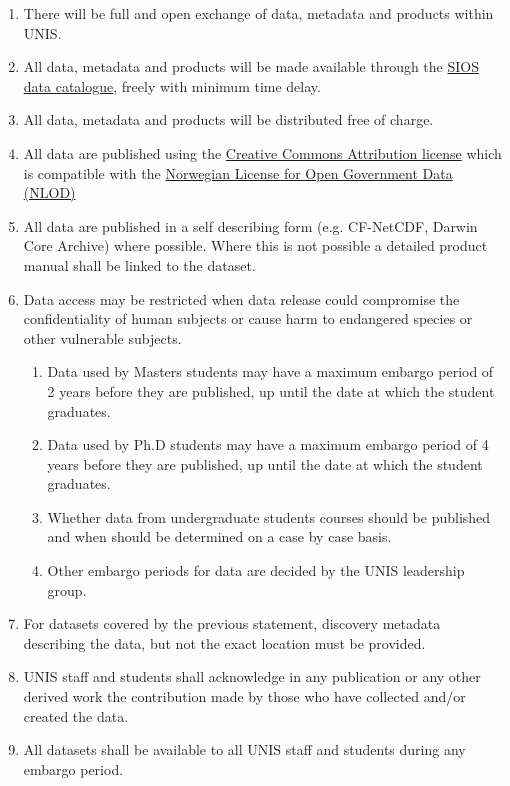 \documentclass[a4paper,english, 11pt]{article}
\begin{document}
\begin{enumerate}[I]
\item There will be full and open exchange of data, metadata and products within UNIS.
\item All data, metadata and products will be made available through the \href{https://sios-svalbard.org/metsis/search}{SIOS data catalogue}, freely with minimum time delay.
\item All data, metadata and products will be distributed free of charge.
\item All data are published using the \href{https://creativecommons.org/licenses/by/4.0/}{Creative Commons Attribution license} which is
compatible with the \href{https://data.norge.no/nlod/en}{Norwegian License for Open Government Data (NLOD)}
\item All data are published in a self describing form (e.g. CF-NetCDF, Darwin Core Archive) where possible. Where this is not possible a detailed product manual shall be linked to the dataset.
\item Data access may be restricted when data release could compromise the confidentiality
of human subjects or cause harm to endangered species or other vulnerable subjects.
\begin{enumerate}[A]
\item Data used by Masters students may have a maximum embargo period of 2 years before
they are published, up until the date at which the student graduates.
\item Data used by Ph.D students may have a maximum embargo period of 4 years before
they are published, up until the date at which the student graduates.
\item Whether data from undergraduate students courses should be published and when should be determined on a case by case basis.
\item Other embargo periods for data are decided by the UNIS leadership group.
\end{enumerate}
\item For datasets covered by the previous statement, discovery metadata describing the data, but not the exact location must be provided.
\item UNIS staff and students shall acknowledge in any publication or any other derived work the contribution made by those who have collected and/or created the data.
\item All datasets shall be available to all UNIS staff and students during any embargo period.
\end{enumerate}
\end{document}
